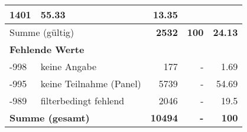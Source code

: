 \begin{longtable}{lXrrr}
       \num{1401} &
       \num[round-mode=places,round-precision=2]{55,33} &
         \num[round-mode=places,round-precision=2]{13,35} \\
     \midrule
     \multicolumn{2}{l}{Summe (gültig)} &
       \textbf{\num{2532}} &
     \textbf{100} &
       \textbf{\num[round-mode=places,round-precision=2]{24,13}} \\
     \multicolumn{5}{l}{\textbf{Fehlende Werte}}\\
       -998 &
       keine Angabe &
         \num{177} &
        - &
         \num[round-mode=places,round-precision=2]{1,69} \\
       -995 &
       keine Teilnahme (Panel) &
         \num{5739} &
        - &
         \num[round-mode=places,round-precision=2]{54,69} \\
       -989 &
       filterbedingt fehlend &
         \num{2046} &
        - &
         \num[round-mode=places,round-precision=2]{19,5} \\
     \midrule
     \multicolumn{2}{l}{\textbf{Summe (gesamt)}} &
          \textbf{\num{10494}} &
        \textbf{-} &
        \textbf{100} \\
     \bottomrule
     \end{longtable}
     
